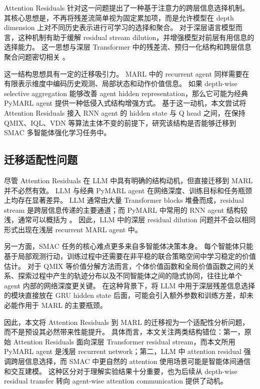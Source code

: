 Attention Residuals 针对这一问题提出了一种基于注意力的跨层信息选择机制。
其核心思想是，不再将残差流简单视为固定累加项，而是允许模型在 depth dimension 上对不同历史表示进行可学习的选择和聚合。
对于深层语言模型而言，这种机制有助于缓解 residual stream dilution，并增强模型对前层有用信息的选择能力。
这一思想与深层 Transformer 中的残差流、预归一化结构和跨层信息聚合问题密切相关 \cite{vaswani2017attention,xiong2020layernorm,kimi2026attentionresiduals}。

这一结构思想具有一定的迁移吸引力。
MARL 中的 recurrent agent 同样需要在有限表示维度中编码历史观测、局部状态和动作价值信息。
如果 depth-wise selective aggregation 能够改善 agent hidden representation，那么它可能为经典 PyMARL agent 提供一种低侵入式结构增强方式。
基于这一动机，本文尝试将 Attention Residuals 接入 RNN agent 的 hidden state 与 Q head 之间，在保持 QMIX、IQL、VDN 等算法主体不变的前提下，研究该结构是否能够迁移到 SMAC 多智能体强化学习任务中。

\subsection{迁移适配性问题}

尽管 Attention Residuals 在 LLM 中具有明确的结构动机，但直接迁移到 MARL 并不必然有效。
LLM 与经典 PyMARL agent 在网络深度、训练目标和任务瓶颈上均存在显著差异。
LLM 通常由大量 Transformer blocks 堆叠而成，residual stream 是跨层信息传递的主要通道；而 PyMARL 中常用的 RNN agent 结构较浅，通常可以概括为 。
因此，LLM 中的深层 residual dilution 问题并不会以相同形式出现在浅层 recurrent MARL agent 中。

另一方面，SMAC 任务的核心难点更多来自多智能体决策本身。
每个智能体只能基于局部观测行动，训练过程中还需要在非平稳的联合策略空间中学习稳定的价值估计。
对于 QMIX 等价值分解方法而言，个体价值函数和全局价值函数之间的关系、探索过程中产生的轨迹分布以及不同智能体之间的隐式协同，往往比单个 agent 内部的网络深度更关键。
在这种背景下，将 LLM 中用于深层残差信息选择的模块直接放在 GRU hidden state 后面，可能会引入额外参数和训练方差，却未必能作用于 MARL 的主要瓶颈。

因此，本文将 Attention Residuals 到 MARL 的迁移视为一个适配性分析问题，而不是预设其必然带来性能提升。
具体而言，本文关注两类结构错位：第一，原始 Attention Residuals 面向深层 Transformer residual stream，而本文所用 PyMARL agent 是浅层 recurrent network；第二，LLM 中 attention residual 强调跨层信息选择，而 SMAC 中更自然的 attention 使用场景可能是智能体间通信和交互建模。
这种区分对于理解实验结果十分重要，也为后续从 depth-wise residual transfer 转向 agent-wise attention communication 提供了动机。

